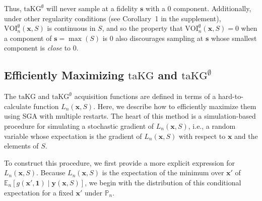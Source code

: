 \documentclass[letterpaper]{article}
\newcommand{\E}{\mathbb{E}}
\newcommand{\x}{\mathbf{x}}
\newcommand{\s}{\mathbf{s}}
\newcommand{\Y}{\mathbf{y}}
\renewcommand{\S}{S}
\newcommand{\one}{\mathbf{1}}
\newcommand{\loss}{L}
\newcommand{\taKG}{\text{taKG}}
\newcommand{\taKGE}{\text{taKG}^\emptyset}
\newcommand{\VOIE}{\text{VOI}^\emptyset}
\numberwithin{equation}{section}
\newcommand{\pfcomment}[1]{{\color{blue} PF: #1}}
\begin{document}
Thus, $\taKGE$ will never sample at a fidelity $\s$ with a $0$ component.
Additionally, under other regularity conditions (see Corollary~1 in the supplement), $\VOIE_n(\x,\S)$ is continuous in $\S$, and so the property that $\VOIE_n(\x,\S)=0$ when a component of $\s=\max(S)$ is 0 also discourages sampling at $\s$ whose smallest component is {\it close} to 0.



\subsection{Efficiently Maximizing $\taKG$ and $\taKGE$}
\label{sect:optimize}


The $\taKG$ and $\taKGE$ acquisition functions are defined in terms of a hard-to-calculate function $\loss_n(\x,\S)$.  Here, we describe how to efficiently maximize them using SGA with multiple restarts.  The heart of this method is a simulation-based procedure for simulating a stochastic gradient of $\loss_n(\x,\S)$, i.e., a random variable whose expectation is the gradient of $\loss_n(\x,\S)$ with respect to $\x$ and the elements of $\S$.

To construct this procedure, we first provide a more explicit expression for $\loss_n(\x,\S)$.
Because $\loss_n(\x,\S)$ is the expectation of the minimum over $\x'$ of $\E_n\left[g(\x',\one) \mid \Y(\x,\S)\right]$, 
we begin with the distribution of this conditional expectation for a fixed $\x'$ under $\mathbb{P}_n$.
\end{document}
